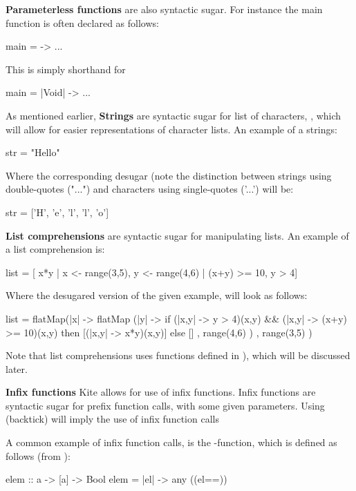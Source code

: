 \textbf{Parameterless functions} are also syntactic sugar. For instance the main function is often declared as follows:

\begin{kite}
main = -> {
  ...
}
\end{kite}

This is simply shorthand for

\begin{kite}
main = |Void| -> {
  ...
}
\end{kite}

As mentioned earlier, \textbf{Strings} are syntactic sugar for list of characters, , which will allow for easier representations of character lists. An example of a strings:

\begin{kite}
str = "Hello"
\end{kite}

Where the corresponding desugar (note the distinction between strings using double-quotes ("...") and characters using single-quotes ('...') will be:

\begin{kite}
str = ['H', 'e', 'l', 'l', 'o']
\end{kite}

\label{sec:ex-listcomp}
\textbf{List comprehensions} are syntactic sugar for manipulating lists. An example of a list comprehension is:

\begin{kite}
list = [ x*y | x <- range(3,5), y <- range(4,6) | (x+y) >= 10, y > 4]
\end{kite}

Where the desugared version of the given example, will look as follows:

\begin{kite}
list =
flatMap(|x| -> {
  flatMap (|y| -> {
    if (|x,y| -> {y > 4})(x,y) && (|x,y| -> {(x+y) >= 10})(x,y)
       then [(|x,y| -> {x*y})(x,y)]
       else []
  } , range(4,6) )
}, range(3,5) )
\end{kite}

Note that list comprehensions uses functions defined in ), which will be discussed later.

\textbf{Infix functions} Kite allows for use of infix functions. Infix functions are syntactic sugar for prefix function calls, with some given parameters. Using  (backtick) will imply the use of infix function calls

A common example of infix function calls, is the -function, which is defined as follows (from ):
\begin{kite}
  elem :: a -> [a] -> Bool
  elem = |el| -> {
    any ((el==))
  }
\end{kite}

